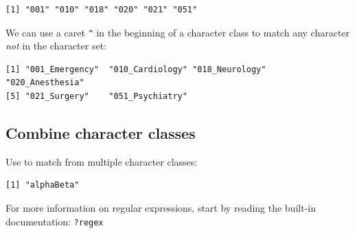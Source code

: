 \documentclass[
]{book}
\newenvironment{Shaded}{\begin{snugshade}}{\end{snugshade}}
\newcommand{\FunctionTok}[1]{\textcolor[rgb]{0.00,0.00,0.00}{#1}}
\newcommand{\NormalTok}[1]{#1}
\newcommand{\OtherTok}[1]{\textcolor[rgb]{0.56,0.35,0.01}{#1}}
\newcommand{\StringTok}[1]{\textcolor[rgb]{0.31,0.60,0.02}{#1}}
\begin{document}
\begin{verbatim}
[1] "001" "010" "018" "020" "021" "051"
\end{verbatim}

We can use a caret \texttt{\^{}} in the beginning of a character class to match any character \emph{not} in the character set:

\begin{Shaded}
\end{Shaded}

\begin{verbatim}
[1] "001_Emergency"  "010_Cardiology" "018_Neurology"  "020_Anesthesia"
[5] "021_Surgery"    "051_Psychiatry"
\end{verbatim}

\hypertarget{combine-character-classes}{%
\subsection{Combine character classes}\label{combine-character-classes}}

Use \texttt{\textbar{}} to match from multiple character classes:

\begin{Shaded}
\end{Shaded}

\begin{verbatim}
[1] "alphaBeta"
\end{verbatim}

\begin{rmdinfo}
For more information on regular expressions, start by reading the
built-in documentation: \texttt{?regex}
\end{rmdinfo}
\end{document}
